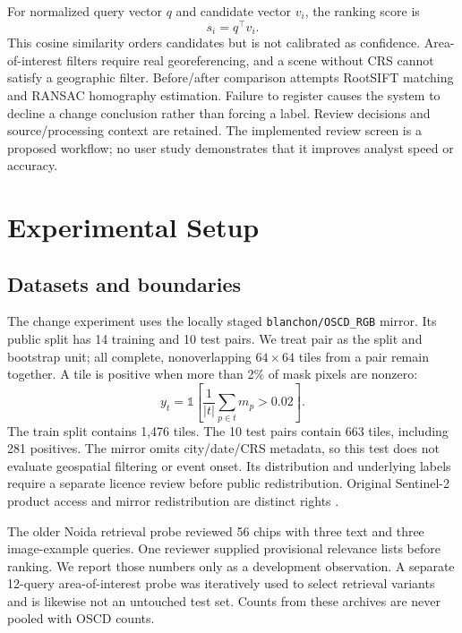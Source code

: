 \documentclass[conference,a4paper]{IEEEtran}
\begin{document}
For normalized query vector $q$ and candidate vector $v_i$, the ranking score is
\begin{equation} s_i=q^\top v_i. \end{equation}
This cosine similarity orders candidates but is not calibrated as confidence. Area-of-interest filters require real georeferencing, and a scene without CRS cannot satisfy a geographic filter. Before/after comparison attempts RootSIFT matching and RANSAC homography estimation. Failure to register causes the system to decline a change conclusion rather than forcing a label. Review decisions and source/processing context are retained. The implemented review screen is a proposed workflow; no user study demonstrates that it improves analyst speed or accuracy.

\section{Experimental Setup}
\subsection{Datasets and boundaries}
The change experiment uses the locally staged \texttt{blanchon/OSCD\_RGB} mirror. Its public split has 14 training and 10 test pairs. We treat pair as the split and bootstrap unit; all complete, nonoverlapping $64\times64$ tiles from a pair remain together. A tile is positive when more than 2\% of mask pixels are nonzero:
\begin{equation} y_t=\mathbb{1}\left[\frac{1}{|t|}\sum_{p\in t}m_p>0.02\right]. \end{equation}
The train split contains 1,476 tiles. The 10 test pairs contain 663 tiles, including 281 positives. The mirror omits city/date/CRS metadata, so this test does not evaluate geospatial filtering or event onset. Its distribution and underlying labels require a separate licence review before public redistribution. Original Sentinel-2 product access and mirror redistribution are distinct rights \cite{esa2026sentinel,daudt2018urban}.

The older Noida retrieval probe reviewed 56 chips with three text and three image-example queries. One reviewer supplied provisional relevance lists before ranking. We report those numbers only as a development observation. A separate 12-query area-of-interest probe was iteratively used to select retrieval variants and is likewise not an untouched test set. Counts from these archives are never pooled with OSCD counts.
\end{document}
